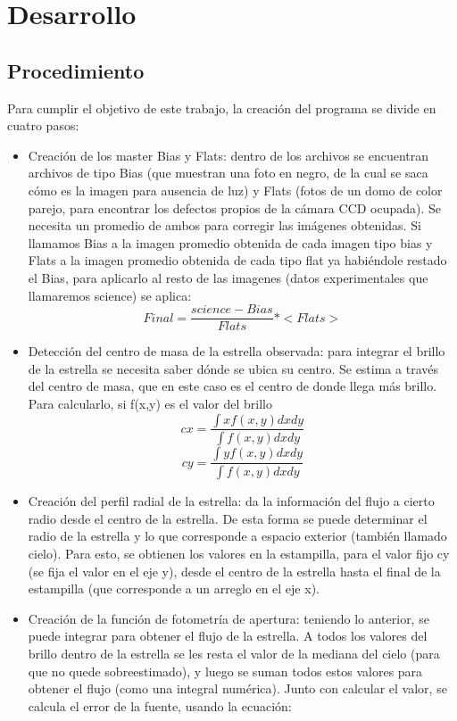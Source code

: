 \documentclass[a4paper, 11pt, spanish]{article}
\begin{document}
\section{Desarrollo}
\subsection{Procedimiento}

Para cumplir el objetivo de este trabajo, la creaci\'on del programa se divide en cuatro pasos:

\begin{itemize}
	\item Creaci\'on de los master Bias y Flats: dentro de los archivos se encuentran archivos de tipo Bias (que muestran una foto en negro, de la cual se saca c\'omo es la imagen para ausencia de luz) y Flats (fotos de un domo de color parejo, para encontrar los defectos propios de la c\'amara CCD ocupada). Se necesita un promedio de ambos para corregir las im\'agenes obtenidas. Si llamamos Bias a la imagen promedio obtenida de cada imagen tipo bias y Flats a la imagen promedio obtenida de cada tipo flat ya habi\'endole restado el Bias, para aplicarlo al resto de las imagenes (datos experimentales que llamaremos science) se aplica:
	\begin{equation*}
	Final = \frac{science - Bias}{Flats} * <Flats>
	\end{equation*}
	\item Detecci\'on del centro de masa de la estrella observada: para integrar el brillo de la estrella se necesita saber d\'onde se ubica su centro. Se estima a trav\'es del centro de masa, que en este caso es el centro de donde llega m\'as brillo. Para calcularlo, si f(x,y) es el valor del brillo 
	\begin{equation*}
	cx = \frac{\int xf(x,y) dx dy}{\int f(x,y) dx dy}
	\end{equation*}
	\begin{equation*}
	cy = \frac{\int yf(x,y) dx dy}{\int f(x,y) dx dy}
	\end{equation*}
	\item Creaci\'on del perfil radial de la estrella: da la informaci\'on del flujo a cierto radio desde el centro de la estrella. De esta forma se puede determinar el radio de la estrella y lo que corresponde a espacio exterior (tambi\'en llamado cielo). Para esto, se obtienen los valores en la estampilla, para el valor fijo cy (se fija el valor en el eje y), desde el centro de la estrella hasta el final de la estampilla (que corresponde a un arreglo en el eje x). 
	\item Creaci\'on de la funci\'on de fotometr\'ia de apertura: teniendo lo anterior, se puede integrar para obtener el flujo de la estrella. A todos los valores del brillo dentro de la estrella se les resta el valor de la mediana del cielo (para que no quede sobreestimado), y luego se suman todos estos valores para obtener el flujo (como una integral num\'erica). Junto con calcular el valor, se calcula el error de la fuente, usando la ecuaci\'on:
	

\end{itemize}
\end{document}
